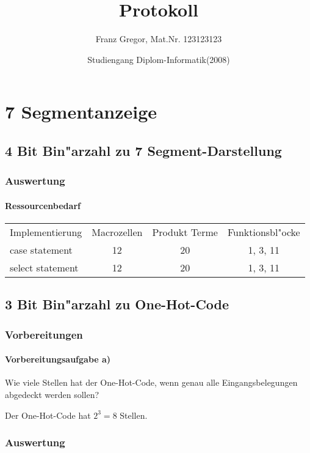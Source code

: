 \documentclass [] {scrartcl}
\begin{document}
  \subject{Praktikums Programmierbare Schaltkreise}
  \title{Protokoll}
  \author{Franz Gregor, Mat.Nr. 123123123 \and Studiengang Diplom-Informatik(2008)}

  \maketitle

  \section{7 Segmentanzeige}
  \subsection{4 Bit Bin"arzahl zu 7 Segment-Darstellung}
  \subsubsection{Auswertung}
  \paragraph{Ressourcenbedarf}
  \begin{table}
    \begin{tabular}{lccc}
      Implementierung & Macrozellen & Produkt Terme & Funktionsbl"ocke\\
      case statement & 12 & 20 & 1, 3, 11\\
      select statement & 12 & 20 & 1, 3, 11\\
    \end{tabular}
  \end{table}
  \subsection{3 Bit Bin"arzahl zu One-Hot-Code}
  \subsubsection{Vorbereitungen}
  \paragraph{Vorbereitungsaufgabe a)}
  Wie viele Stellen hat der One-Hot-Code, wenn genau alle Eingangsbelegungen abgedeckt werden sollen?

  Der One-Hot-Code hat $2^3 = 8$ Stellen.
  \subsubsection{Auswertung}
\end{document}
